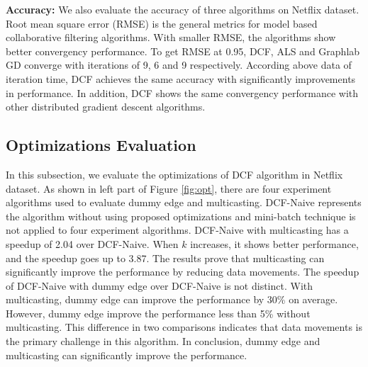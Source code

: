 \documentclass{llncs}
\begin{document}
\textbf{Accuracy:} We also evaluate the accuracy of three algorithms on Netflix dataset. Root mean square error (RMSE) \cite{towards} is the general metrics for model based collaborative filtering algorithms. With smaller RMSE, the algorithms show better convergency performance. To get RMSE at 0.95, DCF, ALS and Graphlab GD converge with iterations of 9, 6 and 9 respectively. According above data of iteration time, DCF achieves the same accuracy with significantly improvements in performance. In addition, DCF shows the same convergency performance with other distributed gradient descent algorithms.


\vspace{-10pt}
\subsection{Optimizations Evaluation}
\vspace{-5pt}
\label{sub:opt}

In this subsection, we evaluate the optimizations of DCF algorithm in Netflix dataset. As shown in left part of Figure \ref{fig:opt}, there are four experiment algorithms used to evaluate dummy edge and multicasting. DCF-Naive represents the algorithm without using proposed optimizations and mini-batch technique is not applied to four experiment algorithms. DCF-Naive with multicasting has a speedup of 2.04 over DCF-Naive. When $k$ increases, it shows better performance, and the speedup goes up to 3.87. The results prove that multicasting can significantly improve the performance by reducing data movements. The speedup of DCF-Naive with dummy edge over DCF-Naive is not distinct. With multicasting, dummy edge can improve the performance by 30\% on average. However, dummy edge improve the performance less than 5\% without multicasting. This difference in two comparisons indicates that data movements is the primary challenge in this algorithm. In conclusion, dummy edge and multicasting can significantly improve the performance.
\end{document}

